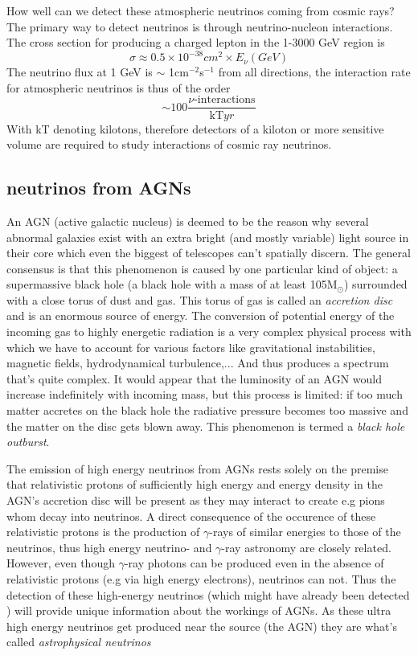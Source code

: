How well can we detect these atmospheric neutrinos coming from cosmic rays?
The primary way to detect neutrinos is through neutrino-nucleon interactions.
The cross section for producing a charged lepton
\cite{gaisser_engel_resconi_2016} in the 1-3000 GeV region is
\begin{equation}
	\sigma \approx 0.5\times 10^{-38} cm^2\times E_\nu (GeV)
\end{equation}
The neutrino flux at 1 GeV is $\sim$ 1cm$^{-2}$s$^{-1}$ from all directions, the interaction rate for
atmospheric neutrinos is thus of the order 
\begin{equation}
	\sim 100\frac{\nu\text{-interactions}}{\text{kT} yr}
\end{equation}
With kT denoting kilotons, therefore detectors of a kiloton or more sensitive
volume are required to study interactions of cosmic ray
neutrinos\cite{GreisenAndReines}.

\subsection{neutrinos from AGNs}
An AGN (active galactic nucleus) is deemed to be the reason why several abnormal galaxies exist with
an extra bright (and mostly variable) light source in their core which even the biggest of telescopes
can't spatially discern. The general consensus is that this phenomenon is caused by one particular
kind of object: a supermassive black hole (a black hole with a mass of at least 105M$_\odot$) surrounded with
a close torus of dust and gas\cite{Shields_1999}.
This torus of gas is called an \textit{accretion disc} and is an enormous source of energy. The conversion
of potential energy of the incoming gas to highly energetic radiation is a very complex physical process
with which we have to account for various factors like gravitational instabilities, magnetic fields, hydrodynamical
turbulence,... And thus produces a spectrum that's quite complex.
It would appear that the luminosity of an AGN would increase indefinitely with incoming mass, but this process is 
limited: if too much matter accretes on the black hole the radiative pressure becomes too massive and the 
matter on the disc gets blown away. This phenomenon is termed a \textit{black hole outburst}.

The emission of high energy neutrinos from AGNs rests solely on the premise
that relativistic protons of sufficiently high energy and energy density in the
AGN's accretion disc will be present \cite{NASANeutrinos} as they may interact
to create e.g pions whom decay into neutrinos. A direct consequence of the occurence of these
relativistic protons is the production of $\gamma$-rays of similar energies to
those of the neutrinos, thus high energy neutrino- and $\gamma$-ray astronomy are
closely related.  However, even though $\gamma$-ray photons can be produced
even in the absence of relativistic protons (e.g via high energy electrons),
neutrinos can not.  Thus the detection of these high-energy neutrinos (which
might have already been detected \cite{AGNNeutrino}) will provide unique
information about the workings of AGNs.
As these ultra high energy neutrinos get produced near the source (the AGN)
they are what's called \textit{astrophysical neutrinos}

